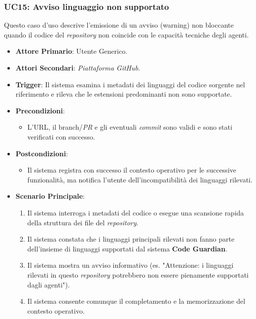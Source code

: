 \documentclass[12pt, a4paper]{article}
\begin{document}
\subsubsection{UC15: Avviso linguaggio non supportato}\label{uc:15}
Questo caso d'uso descrive l'emissione di un avviso (warning) non bloccante quando il codice del \textit{repository} non coincide con le capacità tecniche degli agenti.
\begin{itemize}
    \item \textbf{Attore Primario}: Utente Generico.
    \item \textbf{Attori Secondari}: \textit{Piattaforma GitHub}.
    \item \textbf{Trigger}: Il sistema esamina i metadati dei linguaggi del codice sorgente nel riferimento e rileva che le estensioni predominanti non sono supportate.
    \item \textbf{Precondizioni}:\begin{itemize}\item L'URL, il branch/\textit{PR} e gli eventuali \textit{commit} sono validi e sono stati verificati con successo.\end{itemize}
    \item \textbf{Postcondizioni}:\begin{itemize}\item Il sistema registra con successo il contesto operativo per le successive funzionalità, ma notifica l'utente dell'incompatibilità dei linguaggi rilevati.\end{itemize}
    \item \textbf{Scenario Principale}:
    \begin{enumerate}
        \item Il sistema interroga i metadati del codice o esegue una scansione rapida della struttura dei file del \textit{repository}.
        \item Il sistema constata che i linguaggi principali rilevati non fanno parte dell'insieme di linguaggi supportati dal sistema \textbf{Code Guardian}.
        \item Il sistema mostra un avviso informativo (es. "Attenzione: i linguaggi rilevati in questo \textit{repository} potrebbero non essere pienamente supportati dagli agenti").
        \item Il sistema consente comunque il completamento e la memorizzazione del contesto operativo.
    \end{enumerate}
\end{itemize}
\end{document}
